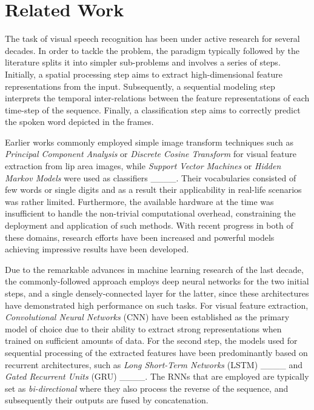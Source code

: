 \section{Related Work}
\label{sec:related}

The task of visual speech recognition has been under active research for several decades.
In order to tackle the problem, the paradigm typically followed by the literature splits it into simpler sub-problems and involves a series of steps.
Initially, a spatial processing step aims to extract high-dimensional feature representations from the input.
Subsequently, a sequential modeling step interprets the temporal inter-relations between the feature representations of each time-step of the sequence.
Finally, a classification step aims to correctly predict the spoken word depicted in the frames.

Earlier works commonly employed simple image transform techniques such as \textit{Principal Component Analysis} or \textit{Discrete Cosine Transform} for visual feature extraction from lip area images, while \textit{Support Vector Machines} or \textit{Hidden Markov Models} were used as classifiers ____.
Their vocabularies consisted of few words or single digits and as a result their applicability in real-life scenarios was rather limited.
Furthermore, the available hardware at the time was insufficient to handle the non-trivial computational overhead, constraining the deployment and application of such methods.
With recent progress in both of these domains, research efforts have been increased and powerful models achieving impressive results have been developed.

Due to the remarkable advances in machine learning research of the last decade, the commonly-followed approach employs deep neural networks for the two initial steps, and a single densely-connected layer for the latter, since these architectures have demonstrated high performance on such tasks.
For visual feature extraction, \textit{Convolutional Neural Networks} (CNN) have been established as the primary model of choice due to their ability to extract strong representations when trained on sufficient amounts of data.
For the second step, the models used for sequential processing of the extracted features have been predominantly based on recurrent architectures, such as \textit{Long Short-Term Networks} (LSTM) ____ and \textit{Gated Recurrent Units} (GRU) ____.
The RNNs that are employed are typically set as \textit{bi-directional} where they also process the reverse of the sequence, and subsequently their outputs are fused by concatenation.

